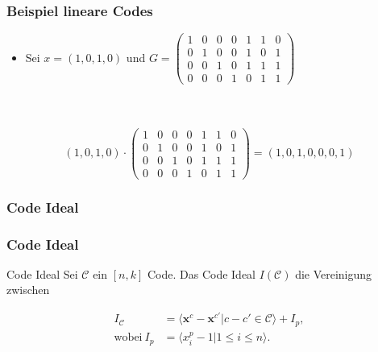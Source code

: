 \documentclass{beamer}
\begin{document}
\begin{frame}[<+->][fragile]
\frametitle{Beispiel lineare Codes}

\begin{itemize}
\item   Sei $x = \left(1,0,1,0\right)$ und $
 G =
 \begin{pmatrix}
 1 & 0 & 0 & 0 & 1 & 1 & 0 \\ 
 0 & 1 & 0 & 0 & 1 & 0 & 1 \\  
 0 & 0 & 1 & 0 & 1 & 1 & 1 \\ 
 0 & 0 & 0 & 1 & 0 & 1 & 1
 \end{pmatrix} 
 $
\end{itemize}

 ~\\
 ~\\
 \[
      \left(1,0,1,0\right) \cdot \begin{pmatrix}
      1 & 0 & 0 & 0 & 1 & 1 & 0 \\ 
      0 & 1 & 0 & 0 & 1 & 0 & 1 \\  
      0 & 0 & 1 & 0 & 1 & 1 & 1 \\ 
      0 & 0 & 0 & 1 & 0 & 1 & 1
      \end{pmatrix}   = \left(1,0,1,0,0,0,1\right) 
  \]




\end{frame}


\frametitle{Code Ideal}
\begin{frame}[<+->]
\frametitle{Code Ideal}

\begin{block}{Code Ideal}
Sei $\mathcal{C}$ ein $[n,k]$ Code. Das Code Ideal $I(\mathcal{C})$ die Vereinigung zwischen

\begin{align*}
 I_{\mathcal{C}} & = \langle \textbf{x}^{c} - \textbf{x}^{c'} | c - c' \in \mathcal{C}  \rangle + I_{p},\\
\textrm{wobei} ~ I_{p} & = \langle x_{i}^{p} - 1 | 1 \leq i \leq n \rangle .
\end{align*}


\end{block}



\end{frame}


\end{document}
